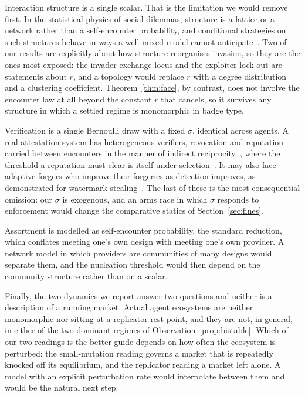 \documentclass[11pt,a4paper]{article}
\theoremstyle{definition}
\begin{document}
Interaction structure is a single scalar. That is the limitation we would
remove first. In the statistical physics of social dilemmas, structure is a
lattice or a network rather than a self-encounter probability, and conditional
strategies on such structures behave in ways a well-mixed model cannot
anticipate~\citep{szolnoki2012conditional,perc2017statphys}. Two of our results
are explicitly about how structure reorganises invasion, so they are the ones
most exposed: the invader-exchange locus and the exploiter lock-out are
statements about $r$, and a topology would replace $r$ with a degree
distribution and a clustering coefficient. Theorem~\ref{thm:face}, by contrast,
does not involve the encounter law at all beyond the constant $r$ that cancels,
so it survives any structure in which a settled regime is monomorphic in badge
type.

Verification is a single Bernoulli draw with a fixed $\sigma$, identical across
agents. A real attestation system has heterogeneous verifiers, revocation and
reputation carried between encounters in the manner of indirect
reciprocity~\citep{santos2018social}, where the threshold a reputation must
clear is itself under selection~\citep{yue2025reputation}. It may also face
adaptive forgers who
improve their forgeries as detection improves, as demonstrated for watermark
stealing~\citep{jovanovic2024watermarkstealing}. The last of these is the most
consequential omission: our $\sigma$ is exogenous, and an arms race in which
$\sigma$ responds to enforcement would change the comparative statics of
Section~\ref{sec:fines}.

Assortment is modelled as self-encounter probability, the standard reduction,
which conflates meeting one's own design with meeting one's own provider. A
network model in which providers are communities of many designs would separate
them, and the nucleation threshold would then depend on the community structure
rather than on a scalar.

Finally, the two dynamics we report answer two questions and neither is a
description of a running market. Actual agent ecosystems are neither
monomorphic nor sitting at a replicator rest point, and they are not, in
general, in either of the two dominant regimes of
Observation~\ref{prop:bistable}. Which of our two readings is the better guide
depends on how often the ecosystem is perturbed: the small-mutation reading
governs a market that is repeatedly knocked off its equilibrium, and the
replicator reading a market left alone. A model with an explicit perturbation
rate would interpolate between them and would be the natural next step.
\end{document}
